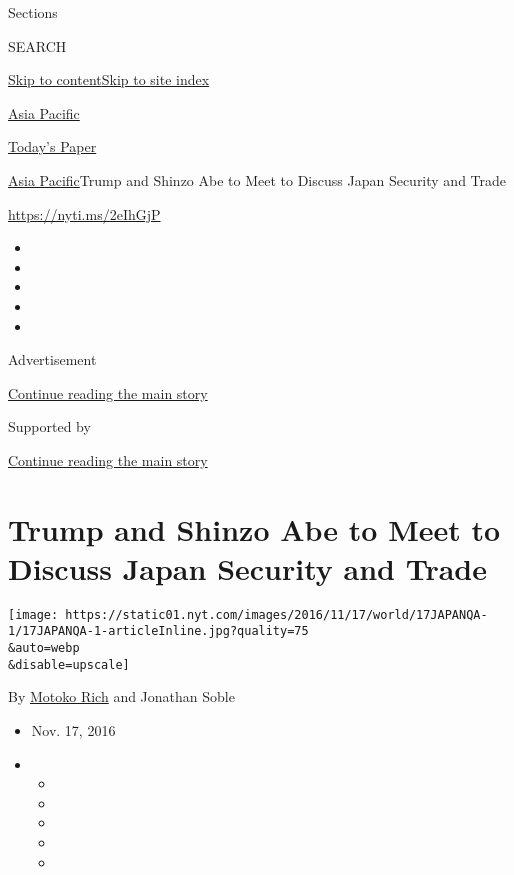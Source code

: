 Sections

SEARCH

\protect\hyperlink{site-content}{Skip to
content}\protect\hyperlink{site-index}{Skip to site index}

\href{https://www.nytimes.com/section/world/asia}{Asia Pacific}

\href{https://myaccount.nytimes.com/auth/login?response_type=cookie\&client_id=vi}{}

\href{https://www.nytimes.com/section/todayspaper}{Today's Paper}

\href{/section/world/asia}{Asia Pacific}\textbar{}Trump and Shinzo Abe
to Meet to Discuss Japan Security and Trade

\url{https://nyti.ms/2eIhGjP}

\begin{itemize}
\item
\item
\item
\item
\item
\end{itemize}

Advertisement

\protect\hyperlink{after-top}{Continue reading the main story}

Supported by

\protect\hyperlink{after-sponsor}{Continue reading the main story}

\hypertarget{trump-and-shinzo-abe-to-meet-to-discuss-japan-security-and-trade}{%
\section{Trump and Shinzo Abe to Meet to Discuss Japan Security and
Trade}\label{trump-and-shinzo-abe-to-meet-to-discuss-japan-security-and-trade}}

\texttt{[image: https://static01.nyt.com/images/2016/11/17/world/17JAPANQA-1/17JAPANQA-1-articleInline.jpg?quality=75\\\&auto=webp\\\&disable=upscale]}

By \href{http://www.nytimes.com/by/motoko-rich}{Motoko Rich} and
Jonathan Soble

\begin{itemize}
\item
  Nov. 17, 2016
\item
  \begin{itemize}
  \item
  \item
  \item
  \item
  \item
  \end{itemize}
\end{itemize}

